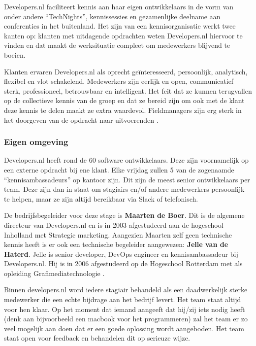 Developers.nl faciliteert kennis aan haar eigen ontwikkelaars in de vorm van onder andere \enquote{TechNights}, kennissessies en gezamenlijke deelname aan conferenties in het buitenland. Het zijn van een kennisorganisatie werkt twee kanten op: klanten met uitdagende opdrachten weten Developers.nl hiervoor te vinden en dat maakt de werksituatie compleet om medewerkers blijvend te boeien.

Klanten ervaren Developers.nl als oprecht geïnteresseerd, persoonlijk, analytisch, flexibel en vlot schakelend. Medewerkers zijn eerlijk en open, communicatief sterk, professioneel, betrouwbaar en intelligent. Het feit dat ze kunnen terugvallen op de collectieve kennis van de groep en dat ze bereid zijn om ook met de klant deze kennis te delen maakt ze extra waardevol. Fieldmanagers zijn erg sterk in het doorgeven van de opdracht naar uitvoerenden \parencite{Stageplan}. 

\subsubsection{Eigen omgeving}
Developers.nl heeft rond de 60 software ontwikkelaars. Deze zijn voornamelijk op een externe opdracht bij ene klant. Elke vrijdag zullen 5 van de zogenaamde \enquote{kennisambassadeurs} op kantoor zijn. Dit zijn de meest senior ontwikkelaars per team. Deze zijn dan in staat om stagiairs en/of andere medewerkers persoonlijk te helpen, maar ze zijn altijd bereikbaar via Slack of telefonisch.

De bedrijfsbegeleider voor deze stage is \textbf{Maarten de Boer}. Dit is de algemene directeur van Developers.nl en is in 2003 afgestudeerd aan de hogeschool Inholland met Strategic marketing. Aangezien Maarten zelf geen technische kennis heeft is er ook een technische begeleider aangewezen: \textbf{Jelle van de Haterd}. Jelle is senior developer, DevOps engineer en kennisambassadeur bij Developers.nl. Hij is in 2006 afgestudeerd op de Hogeschool Rotterdam met als opleiding Grafimediatechnologie \parencite{Afstudeervoorstel}.

Binnen developers.nl word iedere stagiair behandeld als een daadwerkelijk sterke medewerker die een echte bijdrage aan het bedrijf levert. Het team staat altijd voor hen klaar. Op het moment dat iemand aangeeft dat hij/zij iets nodig heeft (denk aan bijvoorbeeld een macbook voor het programmeren) zal het team er zo veel mogelijk aan doen dat er een goede oplossing wordt aangeboden. Het team staat open voor feedback en behandelen dit op serieuze wijze.

